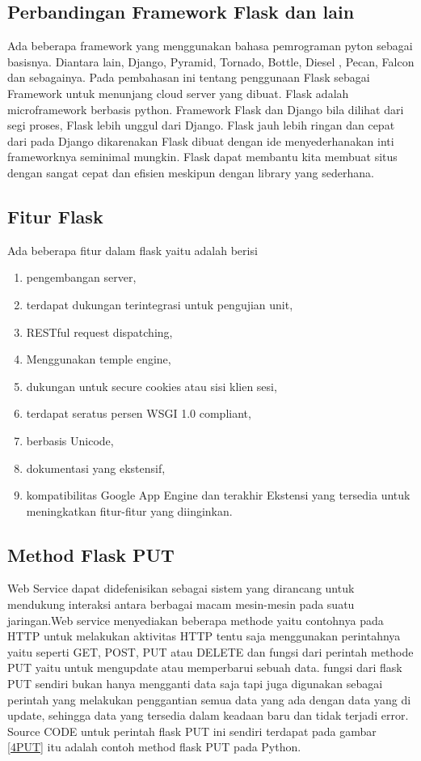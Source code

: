 \subsection{Perbandingan Framework Flask dan lain}
Ada beberapa framework yang menggunakan bahasa pemrograman pyton sebagai basisnya. Diantara lain, Django, Pyramid, Tornado, Bottle, Diesel , Pecan, Falcon dan sebagainya.
Pada pembahasan ini tentang penggunaan Flask sebagai Framework untuk menunjang cloud server yang dibuat. 
Flask adalah microframework berbasis python. Framework Flask dan Django bila dilihat dari segi proses, Flask lebih unggul dari Django. 
Flask jauh lebih ringan dan cepat dari pada Django dikarenakan Flask dibuat dengan ide menyederhanakan inti frameworknya seminimal mungkin. 
Flask dapat membantu kita membuat situs dengan sangat cepat dan efisien meskipun dengan library yang sederhana.

\subsection{Fitur Flask}
Ada beberapa fitur dalam flask yaitu adalah berisi 
\begin{enumerate}
    \item pengembangan server, 
    \item terdapat dukungan terintegrasi untuk pengujian unit, 
    \item RESTful request dispatching, 
    \item Menggunakan temple engine, 
    \item dukungan untuk secure cookies atau sisi klien sesi, 
    \item terdapat seratus persen WSGI 1.0 compliant, 
    \item berbasis Unicode, 
    \item dokumentasi yang ekstensif, 
    \item kompatibilitas Google App Engine dan terakhir Ekstensi yang tersedia untuk meningkatkan fitur-fitur yang diinginkan.
\end{enumerate}

\subsection{Method Flask PUT}
Web Service dapat didefenisikan sebagai sistem yang dirancang untuk mendukung interaksi antara berbagai macam mesin-mesin pada suatu jaringan.Web service menyediakan beberapa methode yaitu contohnya pada  HTTP untuk melakukan aktivitas HTTP tentu saja menggunakan perintahnya yaitu seperti  GET, POST, PUT atau DELETE dan fungsi dari perintah methode PUT yaitu untuk mengupdate atau memperbarui sebuah data.
fungsi dari flask PUT sendiri bukan hanya mengganti data saja tapi
juga digunakan sebagai perintah yang melakukan
penggantian semua data yang ada dengan data yang di update, sehingga
data yang tersedia dalam keadaan baru dan tidak terjadi error.
Source CODE untuk perintah flask PUT ini sendiri terdapat pada gambar \ref{4PUT} 
itu adalah contoh method flask PUT pada Python.

